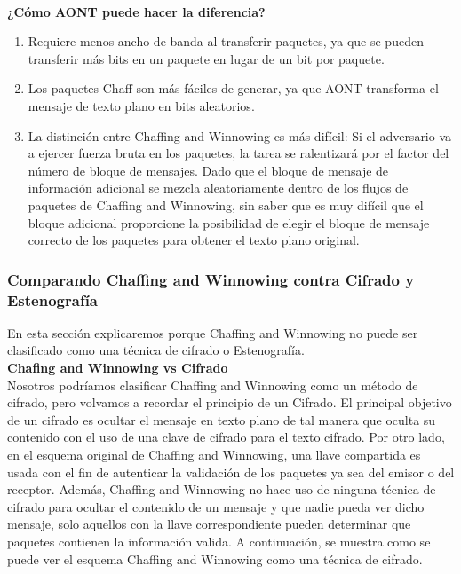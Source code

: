 \documentclass[12pt, a4paper, titlepage]{article}
\begin{document}
        \paragraph{}
        \textbf{¿Cómo AONT puede hacer la diferencia?}\\
        
        \begin{enumerate}
            \item Requiere menos ancho de banda al transferir paquetes, ya que se pueden transferir más bits en un paquete en lugar de un bit por paquete.
            \item Los paquetes Chaff son más fáciles de generar, ya que AONT transforma el mensaje de texto plano en bits aleatorios.
            \item La distinción entre Chaffing and Winnowing es más difícil: Si el adversario va a ejercer fuerza bruta en los paquetes, la tarea se ralentizará por el factor del número de bloque de mensajes. Dado que el bloque de mensaje de información adicional se mezcla aleatoriamente dentro de los flujos de paquetes de Chaffing and Winnowing, sin saber que es muy difícil que el bloque adicional proporcione la posibilidad de elegir el bloque de mensaje correcto de los paquetes para obtener el texto plano original.
        \end{enumerate}
        
        \subsubsection{Comparando Chaffing and Winnowing contra Cifrado y Estenografía}
        
        En esta sección explicaremos porque Chaffing and Winnowing no puede ser clasificado como una técnica de cifrado o Estenografía.\\
        
        \textbf{Chafing and Winnowing vs Cifrado}\\
        
        Nosotros podríamos clasificar Chaffing and Winnowing como un método de cifrado, pero volvamos a recordar el principio de un Cifrado.
        El principal objetivo de un cifrado es ocultar el mensaje en texto plano de tal manera que oculta su contenido con el uso de una clave de cifrado para el texto cifrado.
        Por otro lado, en el esquema original de Chaffing and Winnowing, una llave compartida es usada con el fin de autenticar la validación de los paquetes ya sea del emisor o del receptor. Además, Chaffing and Winnowing no hace uso de ninguna técnica de cifrado para ocultar el contenido de un mensaje y que nadie pueda ver dicho mensaje, solo aquellos con la llave correspondiente pueden determinar que paquetes contienen la información valida. A continuación, se muestra como se puede ver el esquema Chaffing and Winnowing como una técnica de cifrado. 
        
\end{document}
